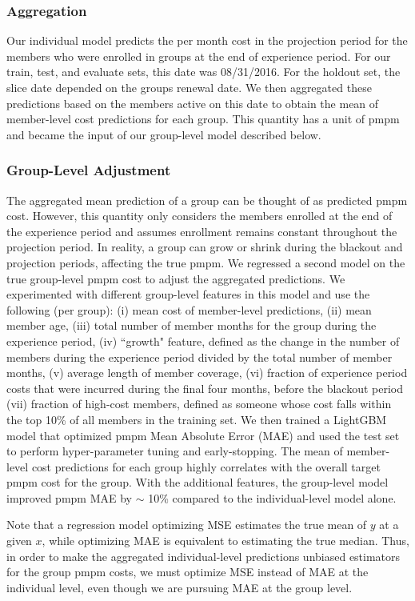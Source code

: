 \documentclass[letterpaper]{article} %
\begin{document}
\subsubsection{Aggregation}
Our individual model predicts the per month cost in the projection period for the members who were enrolled in groups at the end of experience period. For our train, test, and evaluate sets, this date was 08/31/2016. For the holdout set, the slice date depended on the groups renewal date. We then aggregated these predictions based on the members active on this date to obtain the mean of member-level cost predictions for each group. This quantity has a unit of pmpm and became the input of our group-level model described below.

\subsubsection{Group-Level Adjustment}
The aggregated mean prediction of a group can be thought of as predicted pmpm cost. However, this quantity only considers the
members enrolled at the end of the experience period and assumes enrollment remains constant throughout the projection period. In reality, a group can grow or shrink during the blackout and projection periods, affecting the true pmpm. We regressed a second model on the true group-level pmpm cost to
adjust the aggregated predictions. We experimented with different group-level features in this model and use the following (per group):
(i) mean cost of member-level predictions, (ii) mean member age,
(iii) total number of member months for the group during the experience period, (iv) ``growth" feature, defined as the change in the number of members during the experience period divided by the total number of member months, (v) average length of member coverage,
(vi) fraction of experience period costs that were incurred during the final four months, before the blackout period (vii) fraction of high-cost members, defined as someone whose cost falls within the top 10\% of all members in the training set.
We then trained a LightGBM model that optimized pmpm Mean Absolute Error (MAE) and used the test set to perform hyper-parameter tuning and early-stopping. The mean of member-level cost predictions for each group highly correlates with the overall target pmpm cost for the group. With the additional features, the group-level model improved pmpm MAE by $\sim$ 10\% compared to the individual-level model alone.

Note that a regression model optimizing MSE estimates the true mean of $y$ at a given $x$, while optimizing MAE is equivalent to estimating the true median. Thus, in order to make the aggregated individual-level predictions unbiased estimators for the group pmpm costs, we must optimize MSE instead of MAE at the individual level, even though we are pursuing MAE at the group level.
\end{document}
